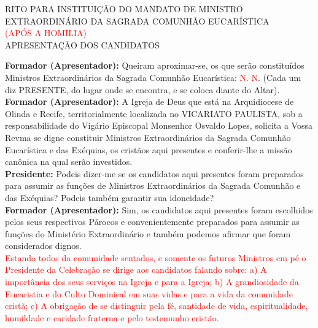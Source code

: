 \documentclass{book}
\begin{document}
\pagestyle{empty}
\begin{center}
    RITO PARA INSTITUIÇÃO DO MANDATO DE MINISTRO EXTRAORDINÁRIO DA SAGRADA COMUNHÃO EUCARÍSTICA
    \vspace{.2cm} \\
    \textcolor{red}{(APÓS A HOMILIA)}
    \vspace{.2cm} \\
    APRESENTAÇÃO DOS CANDIDATOS
    \vspace{.2cm} \\
\end{center}
\begin{flushleft}
    \textbf{Formador (Apresentador):} Queiram aproximar-se, os que serão constituídos Ministros Extraordinários da Sagrada Comunhão Eucarística: \textcolor{red}{N. N}. (Cada um diz PRESENTE, do lugar onde se encontra, e se coloca diante do Altar).
    \vspace{.1cm} \\
    \textbf{Formador (Apresentador):} A Igreja de Deus que está na Arquidiocese de Olinda e Recife, territorialmente localizada no VICARIATO PAULISTA, sob a responsabilidade do Vigário Episcopal Monsenhor Osvaldo Lopes, solicita a Vossa Revma se digne constituir Ministros Extraordinários da Sagrada Comunhão Eucarística e das Exéquias, os cristãos aqui presentes e conferir-lhe a missão canônica na qual serão investidos.
    \vspace{.1cm} \\
    \textbf{Presidente:} Podeis dizer-me se os candidatos aqui presentes foram preparados para assumir as funções de Ministros Extraordinários da Sagrada Comunhão e das Exéquias? Podeis também garantir sua idoneidade?
    \vspace{.1cm} \\
    \textbf{Formador (Apresentador):} Sim, os candidatos aqui presentes foram escolhidos pelos seus respectivos Párocos e convenientemente preparados para assumir as funções do Ministério Extraordinário e também podemos afirmar que foram considerados dignos.
    \vspace{.1cm} \\
    \textcolor{red}{\small Estando todos da comunidade sentados, e somente os futuros Ministros em pé o Presidente da Celebração se dirige aos candidatos falando sobre: a) A importância dos seus serviços na Igreja e para a Igreja; b) A grandiosidade da Eucaristia e do Culto Dominical em suas vidas e para a vida da comunidade cristã; c) A obrigação de se distinguir pela fé, santidade de vida, espiritualidade, humildade e caridade fraterna e pelo testemunho cristão.}
    \vspace{.2cm} \\
\end{flushleft}
\end{document}
